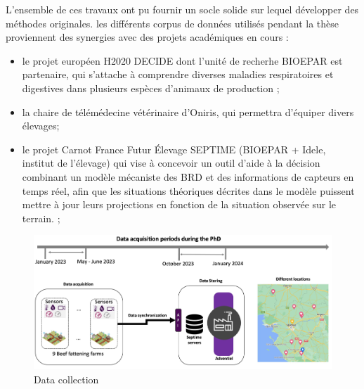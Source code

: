 L’ensemble de ces travaux ont pu fournir un socle solide sur lequel développer des méthodes originales. les différents corpus de données utilisés pendant la thèse proviennent des synergies avec des projets académiques en cours :
\begin{itemize}
    \item le projet européen H2020 DECIDE dont l'unité de recherhe BIOEPAR est partenaire, qui s’attache à comprendre diverses maladies respiratoires et digestives dans plusieurs espèces d’animaux de production ;
    \item la chaire de télémédecine vétérinaire d'Oniris, qui permettra d’équiper divers élevages;
    \item le projet Carnot France Futur Élevage SEPTIME (BIOEPAR + Idele, institut de l’élevage) qui vise à concevoir un outil d’aide à la décision combinant un modèle mécaniste des BRD et des informations de capteurs en temps réel, afin que les situations théoriques décrites dans le modèle puissent mettre à jour leurs projections en fonction de la situation observée sur le terrain. ; 
\end{itemize}

\begin{figure}[h]
  \includegraphics[width=\linewidth]{figures/chap1/data collection.jpg}
  \caption{Data collection}
  \label{fig:chap1-DataCollection}
\end{figure}

